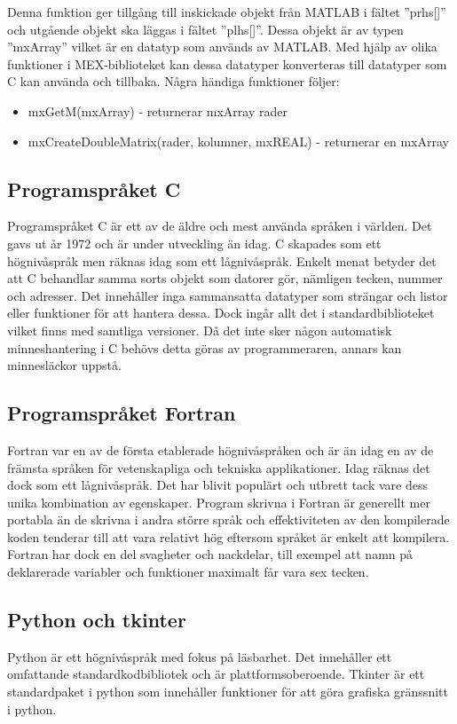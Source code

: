 Denna funktion ger tillgång till inskickade objekt från MATLAB i fältet ''prhs[]'' och utgående objekt ska läggas i fältet ''plhs[]''. Dessa objekt är av typen ''mxArray'' vilket är en datatyp som används av MATLAB. Med hjälp av olika funktioner i MEX-biblioteket kan dessa datatyper konverteras till datatyper som C kan använda och tillbaka\citep{mathworks}. Några händiga funktioner följer:
\begin{itemize}
\item mxGetM(mxArray) - returnerar mxArray rader
\item mxCreateDoubleMatrix(rader, kolumner, mxREAL) - returnerar en mxArray
\end{itemize}

\subsection{Programspråket C}
Programspråket C är ett av de äldre och mest använda språken i världen. Det gavs ut år 1972 och är under utveckling än idag. C skapades som ett högnivåspråk men räknas idag som ett lågnivåspråk. Enkelt menat betyder det att C behandlar samma sorts objekt som datorer gör, nämligen tecken, nummer och adresser. Det innehåller inga sammansatta datatyper som strängar och listor eller funktioner för att hantera dessa. Dock ingår allt det i standardbiblioteket vilket finns med samtliga versioner. Då det inte sker någon automatisk minneshantering i C behövs detta göras av programmeraren, annars kan minnesläckor uppstå. \citep{cbible}

\subsection{Programspråket Fortran}
Fortran var en av de första etablerade högnivåspråken och är än idag en av de främsta språken för vetenskapliga och tekniska applikationer. Idag räknas det dock som ett lågnivåspråk. Det har blivit populärt och utbrett tack vare dess unika kombination av egenskaper. Program skrivna i Fortran är generellt mer portabla än de skrivna i andra större språk och effektiviteten av den kompilerade koden tenderar till att vara relativt hög eftersom språket är enkelt att kompilera. Fortran har dock en del svagheter och nackdelar, till exempel att namn på deklarerade variabler och funktioner maximalt får vara sex tecken. \citep{fortran}     

\subsection{Python och tkinter}
Python är ett högnivåspråk med fokus på läsbarhet. Det innehåller ett omfattande standardkodbibliotek och är plattformsoberoende. \citep{python}  
\newline
\newline
Tkinter är ett standardpaket i python som innehåller funktioner för att göra grafiska gränssnitt i python. \citep{tkinter}   

